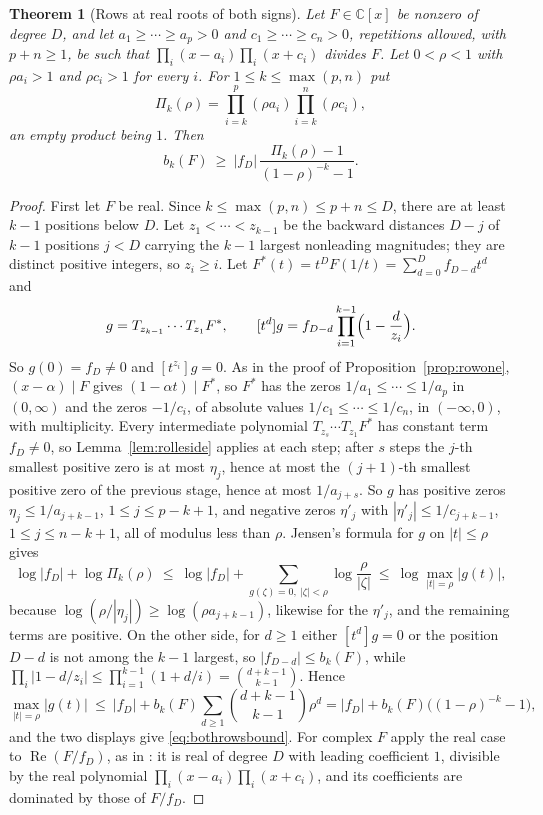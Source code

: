 \documentclass[11pt]{article}
\newtheorem{theorem}{Theorem}[section]
\begin{document}
\begin{theorem}[Rows at real roots of both signs]\label{thm:bothsigns}
Let $F\in\mathbb C[x]$ be nonzero of degree $D$, and let
$a_1\ge\cdots\ge a_p>0$ and $c_1\ge\cdots\ge c_n>0$, repetitions allowed, with
$p+n\ge1$, be such that $\prod_{i}(x-a_i)\prod_i(x+c_i)$ divides $F$.  Let
$0<\rho<1$ with $\rho a_i>1$ and $\rho c_i>1$ for every $i$.  For
$1\le k\le\max(p,n)$ put
\[
  \Pi_k(\rho)=\prod_{i=k}^{p}(\rho a_i)\prod_{i=k}^{n}(\rho c_i),
\]
an empty product being $1$.  Then
\begin{equation}\label{eq:bothrowsbound}
  b_k(F)\ \ge\ |f_D|\,\frac{\Pi_k(\rho)-1}{(1-\rho)^{-k}-1}.
\end{equation}
\end{theorem}

\begin{proof}
First let $F$ be real.  Since $k\le\max(p,n)\le p+n\le D$, there are at least
$k-1$ positions below $D$.  Let $z_1<\cdots<z_{k-1}$ be the backward distances
$D-j$ of $k-1$ positions $j<D$ carrying the $k-1$ largest nonleading
magnitudes; they are distinct positive integers, so $z_i\ge i$.  Let
$F^*(t)=t^DF(1/t)=\sum_{d=0}^Df_{D-d}t^d$ and
\[
  g=T_{z_{k-1}}\cdots T_{z_1}F^*,\qquad
  [t^d]g=f_{D-d}\prod_{i=1}^{k-1}\Bigl(1-\frac d{z_i}\Bigr).
\]
So $g(0)=f_D\ne0$ and $[t^{z_i}]g=0$.  As in the proof of
Proposition~\ref{prop:rowone}, $(x-\alpha)\mid F$ gives $(1-\alpha t)\mid F^*$,
so $F^*$ has the zeros $1/a_1\le\cdots\le1/a_p$ in $(0,\infty)$ and the zeros
$-1/c_i$, of absolute values $1/c_1\le\cdots\le1/c_n$, in $(-\infty,0)$, with
multiplicity.  Every intermediate polynomial $T_{z_s}\cdots T_{z_1}F^*$ has
constant term $f_D\ne0$, so Lemma~\ref{lem:rolleside} applies at each step;
after $s$ steps the $j$-th smallest positive zero is at most $\eta_j$, hence
at most the $(j+1)$-th smallest positive zero of the previous stage, hence at most $1/a_{j+s}$.  So $g$ has positive
zeros $\eta_j\le1/a_{j+k-1}$, $1\le j\le p-k+1$, and negative zeros
$\eta'_j$ with $|\eta'_j|\le1/c_{j+k-1}$, $1\le j\le n-k+1$, all of modulus
less than $\rho$.  Jensen's formula for $g$ on $|t|\le\rho$ gives
\[
  \log|f_D|+\log\Pi_k(\rho)\ \le\
  \log|f_D|+\sum_{g(\zeta)=0,\ |\zeta|<\rho}\log\frac\rho{|\zeta|}\ \le\
  \log\max_{|t|=\rho}|g(t)|,
\]
because $\log(\rho/|\eta_j|)\ge\log(\rho a_{j+k-1})$, likewise for the
$\eta'_j$, and the remaining terms are positive.  On the other side, for
$d\ge1$ either $[t^d]g=0$ or the position $D-d$ is not among the $k-1$ largest,
so $|f_{D-d}|\le b_k(F)$, while
$\prod_i|1-d/z_i|\le\prod_{i=1}^{k-1}(1+d/i)=\binom{d+k-1}{k-1}$.  Hence
\[
  \max_{|t|=\rho}|g(t)|\ \le\ |f_D|+b_k(F)\sum_{d\ge1}\binom{d+k-1}{k-1}\rho^d
  =|f_D|+b_k(F)\bigl((1-\rho)^{-k}-1\bigr),
\]
and the two displays give \eqref{eq:bothrowsbound}.  For complex $F$ apply the
real case to $\operatorname{Re}(F/f_D)$, as in \cite[Corollary~3.3]{coefficient-mass}: it
is real of degree $D$ with leading coefficient $1$, divisible by the real
polynomial $\prod_i(x-a_i)\prod_i(x+c_i)$, and its coefficients are dominated
by those of $F/f_D$.
\end{proof}
\end{document}
